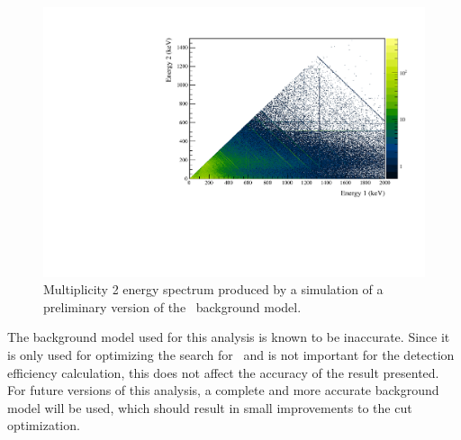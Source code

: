\documentclass[/main.tex]{subfiles}
\begin{document}
\begin{figure}
  \centering
  \includegraphics[width=.9\linewidth]{BGsim2D}
  \caption[Simulation of multiplicty 2 events from the background model]{ \label{fig:bgsim2D}
    Multiplicity 2 energy spectrum produced by a simulation of a preliminary version of the \MJD\ background model.
  }
\end{figure}
The background model used for this analysis is known to be inaccurate.
Since it is only used for optimizing the search for \bbes\ and is not important for the detection efficiency calculation, this does not affect the accuracy of the result presented.
For future versions of this analysis, a complete and more accurate background model will be used, which should result in small improvements to the cut optimization.
\end{document}
